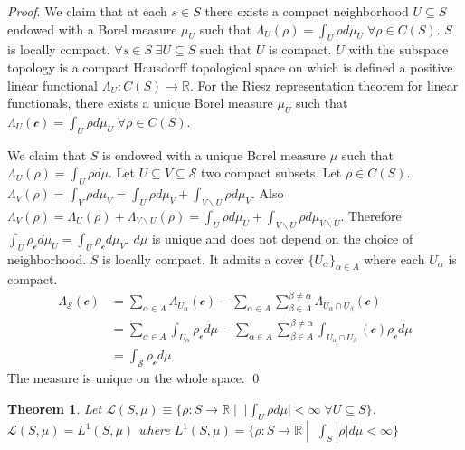 \documentclass[smallextended]{svjour3}
\numberwithin{equation}{section}
\renewenvironment{proof}{\emph{Proof}.}{\hfill\(\qed\)}
\newtheorem{thrm}[equation]{Theorem}
\theoremstyle{definition}
\renewenvironment{proof}{\emph{Proof}.}{\qed}
\begin{document}
\begin{proof}
	We claim that at each $s \in S$ there exists a compact neighborhood $U \subseteq S$ endowed with a Borel measure $\mu_U$ such that $\Lambda_U (\rho) = \int_U \rho d \mu_U \; \forall \rho \in C(S)$. $S$ is locally compact. $\forall s \in S \; \exists U \subseteq S$ such that $U$ is compact. $U$ with the subspace topology is a compact Hausdorff topological space on which is defined a positive linear functional $\Lambda_U : C(S) \rightarrow \mathbb{R}$. For the Riesz representation theorem for linear functionals, there exists a unique Borel measure $\mu_U$ such that $\Lambda_U (\mathcal{c}) = \int_U \rho d \mu_U \; \forall \rho \in C(S)$.
	
	We claim that $S$ is endowed with a unique Borel measure $\mu$ such that $\Lambda_U (\rho) = \int_U \rho d \mu$. Let $U \subseteq V \subseteq \mathcal{S}$ two compact subsets. Let $\rho \in C(S)$. $\Lambda_V (\rho) = \int_V \rho d \mu_V = \int_U \rho d \mu_V + \int_{V\backslash U} \rho d \mu_V$. Also $\Lambda_V (\rho) = \Lambda_U (\rho) + \Lambda_{V\backslash U} (\rho) = \int_U \rho d \mu_U + \int_{V \backslash U} \rho d \mu_{\overline{V \backslash U}} $. Therefore $\int_{U} \rho_{\mathcal{c}} d \mu_U = \int_{U} \rho_{\mathcal{c}} d \mu_V$. $d\mu$ is unique and does not depend on the choice of neighborhood. $S$ is locally compact. It admits a cover $\{U_\alpha\}_{\alpha \in A}$ where each $U_\alpha$ is compact.
	\begin{align*}
	\Lambda_{\mathcal{S}}(\mathcal{c}) &= \sum \limits_{\alpha \in A} \Lambda_{U_\alpha}(\mathcal{c}) - \sum \limits_{\alpha \in A} \sum \limits_{\beta \in A}^{\beta \neq\alpha} \Lambda_{U_\alpha \cap U_\beta}(\mathcal{c}) \\
	&= \sum \limits_{\alpha \in A} \int_{U_\alpha} \rho_{\mathcal{c}} d\mu - \sum \limits_{\alpha \in A} \sum \limits_{\beta \in A}^{\beta \neq\alpha} \int_{U_\alpha \cap U_\beta}(\mathcal{c}) \rho_{\mathcal{c}} d\mu \\
	&= \int_{\mathcal{S}} \rho_{\mathcal{c}} d\mu
	\end{align*}
	The measure is unique on the whole space.
\end{proof}

\begin{thrm}\label{everywhere_integrable_is_lebesgue_integrable}
	Let $\mathcal{L}(S,\mu) \equiv \{ \rho : S \rightarrow \mathbb{R} \; | \;\; |\int_{U} \rho d\mu| < \infty \; \forall U \subseteq S\}$. $\mathcal{L}(S,\mu)=L^1(S,\mu)$ where $L^1(S,\mu) = \{ \rho : S \rightarrow \mathbb{R} \; | \;\; \int_{S} |\rho| d\mu < \infty \}$
\end{thrm}
\end{document}
